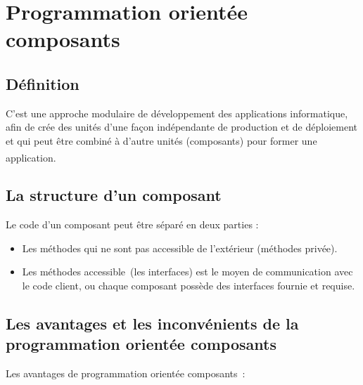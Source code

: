 \documentclass[12pt]{report}
\begin{document}
\section{Programmation orientée composants}
\subsection{Définition}
\vspace{0.1in}
\hspace*{0.16in}
C’est une approche modulaire de développement des applications informatique, afin de crée des unités d’une façon indépendante de production et de déploiement et qui peut être combiné à d’autre unités (composants) pour former une application. \textsuperscript{\cite{stephane2002poo}}

\subsection{La structure d’un composant}
\vspace{0.1in}
Le code d’un composant peut être séparé en deux parties :

\begin{itemize}
    \item Les méthodes qui ne sont pas accessible de l’extérieur (méthodes privée).
    \item Les méthodes accessible (les interfaces) est le moyen de communication avec le code client, ou chaque composant possède des interfaces fournie et requise.
\end{itemize}

\subsection{Les avantages et les inconvénients de la programmation orientée composants}
\vspace{0.1in}
Les avantages de programmation orientée composants :
\end{document}
